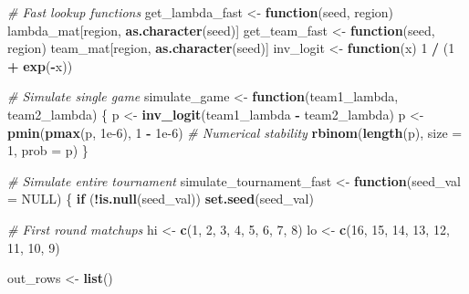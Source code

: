 \documentclass[
]{article}
\newenvironment{Shaded}{\begin{snugshade}}{\end{snugshade}}
\newcommand{\AttributeTok}[1]{\textcolor[rgb]{0.13,0.29,0.53}{#1}}
\newcommand{\CommentTok}[1]{\textcolor[rgb]{0.56,0.35,0.01}{\textit{#1}}}
\newcommand{\ConstantTok}[1]{\textcolor[rgb]{0.56,0.35,0.01}{#1}}
\newcommand{\ControlFlowTok}[1]{\textcolor[rgb]{0.13,0.29,0.53}{\textbf{#1}}}
\newcommand{\DecValTok}[1]{\textcolor[rgb]{0.00,0.00,0.81}{#1}}
\newcommand{\FloatTok}[1]{\textcolor[rgb]{0.00,0.00,0.81}{#1}}
\newcommand{\FunctionTok}[1]{\textcolor[rgb]{0.13,0.29,0.53}{\textbf{#1}}}
\newcommand{\NormalTok}[1]{#1}
\newcommand{\OtherTok}[1]{\textcolor[rgb]{0.56,0.35,0.01}{#1}}
\newcommand{\SpecialCharTok}[1]{\textcolor[rgb]{0.81,0.36,0.00}{\textbf{#1}}}
\begin{document}
\begin{Shaded}
\begin{Highlighting}[]
\CommentTok{\# Fast lookup functions}
\NormalTok{get\_lambda\_fast }\OtherTok{\textless{}{-}} \ControlFlowTok{function}\NormalTok{(seed, region) lambda\_mat[region, }\FunctionTok{as.character}\NormalTok{(seed)]}
\NormalTok{get\_team\_fast }\OtherTok{\textless{}{-}} \ControlFlowTok{function}\NormalTok{(seed, region) team\_mat[region, }\FunctionTok{as.character}\NormalTok{(seed)]}
\NormalTok{inv\_logit }\OtherTok{\textless{}{-}} \ControlFlowTok{function}\NormalTok{(x) }\DecValTok{1} \SpecialCharTok{/}\NormalTok{ (}\DecValTok{1} \SpecialCharTok{+} \FunctionTok{exp}\NormalTok{(}\SpecialCharTok{{-}}\NormalTok{x))}

\CommentTok{\# Simulate single game}
\NormalTok{simulate\_game }\OtherTok{\textless{}{-}} \ControlFlowTok{function}\NormalTok{(team1\_lambda, team2\_lambda) \{}
\NormalTok{    p }\OtherTok{\textless{}{-}} \FunctionTok{inv\_logit}\NormalTok{(team1\_lambda }\SpecialCharTok{{-}}\NormalTok{ team2\_lambda)}
\NormalTok{    p }\OtherTok{\textless{}{-}} \FunctionTok{pmin}\NormalTok{(}\FunctionTok{pmax}\NormalTok{(p, }\FloatTok{1e{-}6}\NormalTok{), }\DecValTok{1} \SpecialCharTok{{-}} \FloatTok{1e{-}6}\NormalTok{) }\CommentTok{\# Numerical stability}
    \FunctionTok{rbinom}\NormalTok{(}\FunctionTok{length}\NormalTok{(p), }\AttributeTok{size =} \DecValTok{1}\NormalTok{, }\AttributeTok{prob =}\NormalTok{ p)}
\NormalTok{\}}

\CommentTok{\# Simulate entire tournament}
\NormalTok{simulate\_tournament\_fast }\OtherTok{\textless{}{-}} \ControlFlowTok{function}\NormalTok{(}\AttributeTok{seed\_val =} \ConstantTok{NULL}\NormalTok{) \{}
    \ControlFlowTok{if}\NormalTok{ (}\SpecialCharTok{!}\FunctionTok{is.null}\NormalTok{(seed\_val)) }\FunctionTok{set.seed}\NormalTok{(seed\_val)}

    \CommentTok{\# First round matchups}
\NormalTok{    hi }\OtherTok{\textless{}{-}} \FunctionTok{c}\NormalTok{(}\DecValTok{1}\NormalTok{, }\DecValTok{2}\NormalTok{, }\DecValTok{3}\NormalTok{, }\DecValTok{4}\NormalTok{, }\DecValTok{5}\NormalTok{, }\DecValTok{6}\NormalTok{, }\DecValTok{7}\NormalTok{, }\DecValTok{8}\NormalTok{)}
\NormalTok{    lo }\OtherTok{\textless{}{-}} \FunctionTok{c}\NormalTok{(}\DecValTok{16}\NormalTok{, }\DecValTok{15}\NormalTok{, }\DecValTok{14}\NormalTok{, }\DecValTok{13}\NormalTok{, }\DecValTok{12}\NormalTok{, }\DecValTok{11}\NormalTok{, }\DecValTok{10}\NormalTok{, }\DecValTok{9}\NormalTok{)}

\NormalTok{    out\_rows }\OtherTok{\textless{}{-}} \FunctionTok{list}\NormalTok{()}


\end{Highlighting}
\end{Shaded}
\end{document}
